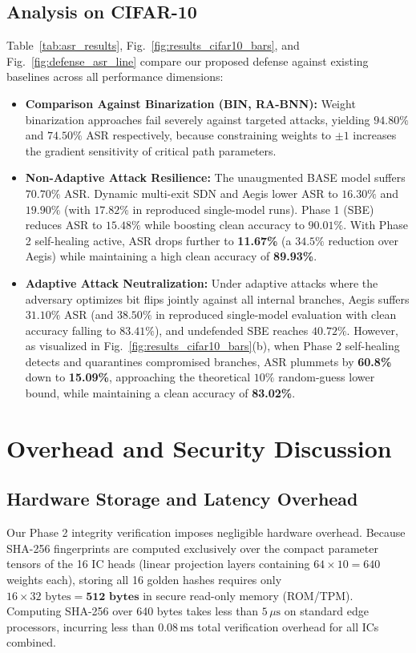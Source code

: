 \documentclass[conference,10pt]{IEEEtran}
\begin{document}
\subsection{Analysis on CIFAR-10}
Table~\ref{tab:asr_results}, Fig.~\ref{fig:results_cifar10_bars}, and Fig.~\ref{fig:defense_asr_line} compare our proposed defense against existing baselines across all performance dimensions:
\begin{itemize}
    \item \textbf{Comparison Against Binarization (BIN, RA-BNN):} Weight binarization approaches fail severely against targeted attacks, yielding $94.80\%$ and $74.50\%$ ASR respectively, because constraining weights to $\pm 1$ increases the gradient sensitivity of critical path parameters.
    \item \textbf{Non-Adaptive Attack Resilience:} The unaugmented BASE model suffers $70.70\%$ ASR. Dynamic multi-exit SDN and Aegis lower ASR to $16.30\%$ and $19.90\%$ (with $17.82\%$ in reproduced single-model runs). Phase 1 (SBE) reduces ASR to $15.48\%$ while boosting clean accuracy to $90.01\%$. With Phase 2 self-healing active, ASR drops further to \textbf{11.67\%} (a $34.5\%$ reduction over Aegis) while maintaining a high clean accuracy of \textbf{89.93\%}.
    \item \textbf{Adaptive Attack Neutralization:} Under adaptive attacks where the adversary optimizes bit flips jointly against all internal branches, Aegis suffers $31.10\%$ ASR (and $38.50\%$ in reproduced single-model evaluation with clean accuracy falling to $83.41\%$), and undefended SBE reaches $40.72\%$. However, as visualized in Fig.~\ref{fig:results_cifar10_bars}(b), when Phase 2 self-healing detects and quarantines compromised branches, ASR plummets by \textbf{60.8\%} down to \textbf{15.09\%}, approaching the theoretical $10\%$ random-guess lower bound, while maintaining a clean accuracy of \textbf{83.02\%}.
\end{itemize}



\section{Overhead and Security Discussion}

\subsection{Hardware Storage and Latency Overhead}
Our Phase 2 integrity verification imposes negligible hardware overhead. Because SHA-256 fingerprints are computed exclusively over the compact parameter tensors of the 16 IC heads (linear projection layers containing $64 \times 10 = 640$ weights each), storing all 16 golden hashes requires only $16 \times 32\text{ bytes} = \mathbf{512\text{ bytes}}$ in secure read-only memory (ROM/TPM). Computing SHA-256 over 640 bytes takes less than $5\,\mu\text{s}$ on standard edge processors, incurring less than $0.08\,\text{ms}$ total verification overhead for all ICs combined.
\end{document}
